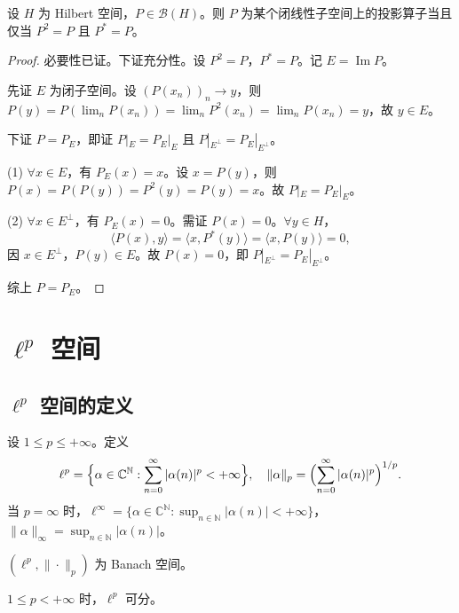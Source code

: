 \documentclass[lang=cn,a4paper,newtx,section]{elegantbook}
\begin{document}
\begin{proposition}
  设 $H$ 为 Hilbert 空间，$P\in\mathcal{B}(H)$。则 $P$ 为某个闭线性子空间上的投影算子当且仅当 $P^2=P$ 且 $P^*=P$。
\end{proposition}

\begin{proof}
  必要性已证。下证充分性。设 $P^2=P$，$P^*=P$。记 $E=\operatorname{Im}P$。

  先证 $E$ 为闭子空间。设 $(P(x_n))_n\to y$，则 $P(y)=P(\lim_n P(x_n))=\lim_n P^2(x_n)=\lim_n P(x_n)=y$，故 $y\in E$。

  下证 $P=P_E$，即证 $P|_E=P_E|_E$ 且 $P|_{E^\perp}=P_E|_{E^\perp}$。

  (1) $\forall x\in E$，有 $P_E(x)=x$。设 $x=P(y)$，则 $P(x)=P(P(y))=P^2(y)=P(y)=x$。故 $P|_E=P_E|_E$。

  (2) $\forall x\in E^\perp$，有 $P_E(x)=0$。需证 $P(x)=0$。$\forall y\in H$，
  \[
    \langle P(x),y\rangle=\langle x,P^*(y)\rangle=\langle x,P(y)\rangle=0,
  \]
  因 $x\in E^\perp$，$P(y)\in E$。故 $P(x)=0$，即 $P|_{E^\perp}=P_E|_{E^\perp}$。

  综上 $P=P_E$。
\end{proof}

\chapter{\texorpdfstring{$\ell^p$}{lp} 空间}

\section{\texorpdfstring{$\ell^p$}{lp} 空间的定义}

\begin{definition}
  设 $1\leq p\leq+\infty$。定义
  \[
    \ell^p=\Bigl\{\alpha\in\mathbb{C}^{\mathbb{N}}:\sum_{n=0}^{\infty}|\alpha(n)|^p<+\infty\Bigr\},\quad\|\alpha\|_p=\Bigl(\sum_{n=0}^{\infty}|\alpha(n)|^p\Bigr)^{1/p}.
  \]
  当 $p=\infty$ 时，$\ell^\infty=\{\alpha\in\mathbb{C}^{\mathbb{N}}:\sup_{n\in\mathbb{N}}|\alpha(n)|<+\infty\}$，$\|\alpha\|_\infty=\sup_{n\in\mathbb{N}}|\alpha(n)|$。
\end{definition}

$(\ell^p,\|\cdot\|_p)$ 为 Banach 空间。

\begin{proposition}
  $1\leq p<+\infty$ 时，$\ell^p$ 可分。
\end{proposition}
\end{document}
